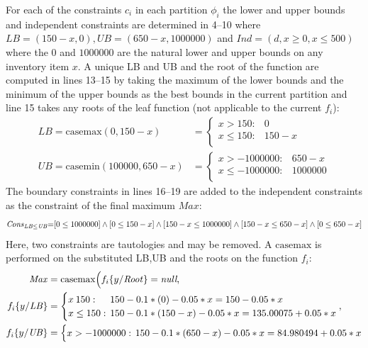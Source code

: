 \documentclass[twoside,11pt]{article}
\newcommand{\casemax}{\mathrm{casemax}}
\newcommand{\casemin}{\mathrm{casemin}}
\newcommand{\UB}{\mathit{UB}}
\newcommand{\LB}{\mathit{LB}}
\newcommand{\IND}{\mathit{Ind}}
\newcommand{\CONS}{\mathit{Cons}}
\newcommand{\Root}{\mathit{Root}}
\newcommand{\Max}{\mathit{Max}}
\newcommand{\sq}{\hspace{-1mm}}
\newcommand{\sqm}{\hspace{-2mm}}
\begin{document}
\begin{enumerate}
For each of the constraints $c_i$ in each partition $\phi_i$ the lower and upper bounds and independent constraints are determined in 4--10 where $\LB = (150 - x, 0) , \UB= (650 - x, 1000000) $ and $\IND=(d,x \geq 0 , x \leq 500) $ where the $0$ and $1000000$ are the natural lower and upper bounds on any inventory item $x$.
A unique LB and UB and the root of the function are computed in lines 13--15 by taking the maximum of the lower bounds and the minimum of the upper bounds as the best bounds in the current partition and line 15 takes any roots of the leaf function (not applicable to the current $f_i$): 
{%
\begin{align*}
\LB = \casemax(0,150-x) & = \begin{cases}
x > 150: & 0\\ 
x \leq 150: & 150 -x \\ 
\end{cases}\\
\UB = \casemin(100000, 650-x) & = \begin{cases}
x > -1000000: & 650 -x  \\ 
x \leq -1000000: &1000000\\ 
\end{cases}
\end{align*}
}  
The boundary constraints in lines 16--19 are added to the independent constraints as the constraint of the final maximum $\mathit{Max}$:
{%
\begin{equation*}
\CONS_{\LB \leq \UB} \sq = \sq [0 \leq 1000000] \land [0 \leq 150 - x] \land [150 - x \leq 1000000] \land [150-x \leq 650 -x] \land [0 \leq 650 - x] 
\end{equation*}}
Here, two constraints are tautologies and may be removed.
A $\casemax$ is performed on the substituted LB,UB and the roots on the function $f_i$: 
{\footnotesize 
\begin{align*}
 \Max &= \casemax \Big( f_i \{ y / \Root \} = \textit{null} , \\
 f_i \{ y / \LB \} &= \begin{cases}
x \> 150: & \sqm 150 - 0.1 * (0) - 0.05 * x = 150 - 0.05 * x \\ 
x \leq 150:    & \sqm 150 - 0.1 * (150 - x ) - 0.05 * x = 135.00075 + 0.05 * x\\ 
\end{cases},\\
 f_i \{ y / \UB \} &= \begin{cases}
x > -1000000:    & \sqm 150 - 0.1 * (650 -x) - 0.05 * x = 84.980494 + 0.05 * x \\ 

\end{cases}
\end{align*}}
\end{enumerate}
\end{document}
